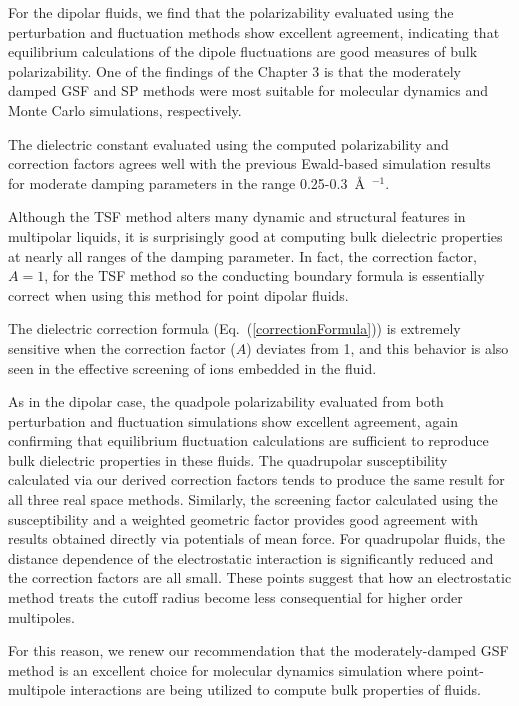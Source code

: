 For the dipolar fluids, we find that the polarizability evaluated
using the perturbation and fluctuation methods show excellent
agreement, indicating that equilibrium calculations of the dipole
fluctuations are good measures of bulk polarizability. One of the
findings of the Chapter 3 is that the moderately
damped GSF and SP methods were most suitable for molecular dynamics
and Monte Carlo simulations, respectively.\cite{PaperII}

The dielectric constant evaluated using the computed polarizability
and correction factors agrees well with the previous Ewald-based
simulation results \cite{Adams81,NeumannI83} for moderate damping
parameters in the range 0.25-0.3~\AA~$^{-1}$. 

Although the TSF method alters many dynamic and structural features in
multipolar liquids,\cite{PaperII} it is surprisingly good at computing
bulk dielectric properties at nearly all ranges of the damping
parameter.  In fact, the correction factor, $A = 1$, for the TSF
method so the conducting boundary formula is essentially correct when
using this method for point dipolar fluids.

The dielectric correction formula (Eq.~(\ref{correctionFormula}))
is extremely sensitive when the correction factor ($A$) deviates from
1, and this behavior is also seen in the effective screening of ions
embedded in the fluid. 

As in the dipolar case, the quadpole polarizability evaluated from
both perturbation and fluctuation simulations show excellent
agreement, again confirming that equilibrium fluctuation calculations
are sufficient to reproduce bulk dielectric properties in these
fluids.  The quadrupolar susceptibility calculated via our derived
correction factors tends to produce the same result for all three real
space methods.  Similarly, the screening factor calculated using the
susceptibility and a weighted geometric factor provides good agreement
with results obtained directly via potentials of mean force.  For
quadrupolar fluids, the distance dependence of the electrostatic
interaction is significantly reduced and the correction factors are
all small.  These points suggest that how an electrostatic method
treats the cutoff radius become less consequential for higher order
multipoles.
   
For this reason, we renew our recommendation that the
moderately-damped GSF method is an excellent choice for molecular
dynamics simulation where point-multipole interactions are being
utilized to compute bulk properties of fluids.

%
% 
% 
